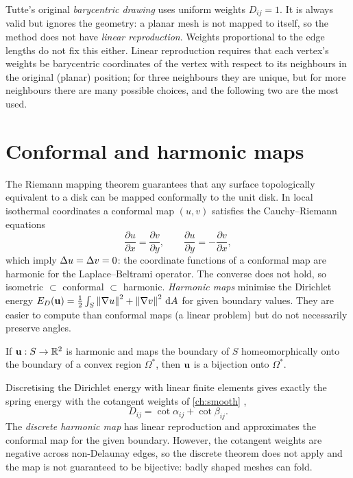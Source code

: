 Tutte's original \emph{barycentric drawing} uses uniform weights $D_{ij}=1$. It is always valid
but ignores the geometry: a planar mesh is not mapped to itself, so the method does not have
\emph{linear reproduction}. Weights proportional to the edge lengths do not fix this either.
Linear reproduction requires that each vertex's weights be barycentric coordinates of the vertex
with respect to its neighbours in the original (planar) position; for three neighbours they are
unique, but for more neighbours there are many possible choices, and the following two are the most
used.

\section{Conformal and harmonic maps}

The Riemann mapping theorem guarantees that any surface topologically equivalent to a disk can be
mapped conformally to the unit disk. In local isothermal coordinates a conformal map
$(u,v)$ satisfies the Cauchy--Riemann equations
\begin{equation}
\frac{\partial u}{\partial x}=\frac{\partial v}{\partial y},\qquad
\frac{\partial u}{\partial y}=-\frac{\partial v}{\partial x},
\end{equation}
which imply $\Delta u=\Delta v=0$: the coordinate functions of a conformal map are harmonic for the
Laplace--Beltrami operator. The converse does not hold, so isometric $\subset$ conformal $\subset$
harmonic. \emph{Harmonic maps} minimise the Dirichlet energy
$E_D(\mathbf{u})=\tfrac12\int_S\left\lVert \nabla u\right\rVert^2+\left\lVert \nabla v\right\rVert^2\,\mathrm{d} A$ for given boundary values. They are
easier to compute than conformal maps (a linear problem) but do not necessarily preserve angles.

\begin{theorem}
If $\mathbf{u}:S\to\mathbb{R}^2$ is harmonic and maps the boundary of $S$ homeomorphically onto the boundary of a
convex region $\Omega^\ast$, then $\mathbf{u}$ is a bijection onto $\Omega^\ast$.
\end{theorem}

Discretising the Dirichlet energy with linear finite elements gives exactly the spring energy with
the cotangent weights of \cref{ch:smooth} \citep{Pinkall1993,Eck1995},
\begin{equation}
D_{ij}=\cot\alpha_{ij}+\cot\beta_{ij} .
\end{equation}
The \emph{discrete harmonic map} has linear reproduction and approximates the conformal map for
the given boundary. However, the cotangent weights are negative across non-Delaunay edges, so the
discrete theorem does not apply and the map is not guaranteed to be bijective: badly shaped meshes
can fold.

